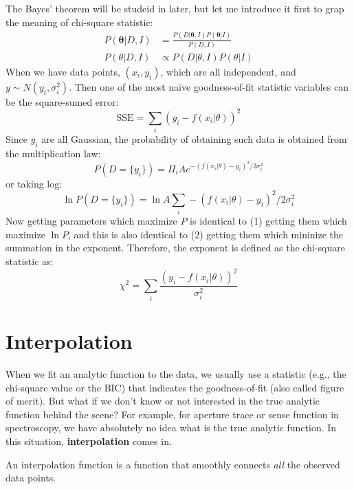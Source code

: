 The Bayes' theorem will be studeid in later, but let me introduce it first to grap the meaning of chi-square statistic:
\begin{align*}
  P(\mathbf{\theta}|D, I) &= \frac{P(D|\mathbf{\theta}, I) P(\mathbf{\theta}|I)}{P(D, I)} \\
  P(\theta|D, I) &\propto P(D | \theta, I) P(\theta|I)
\end{align*}
When we have data points, $ (x_i, y_i) $, which are all independent, and $ y \sim N(y_i, \sigma_i^2) $. Then one of the most na\"{i}ve goodness-of-fit statistic variables can be the square-sumed error:
\begin{equation}\label{eq: sse}
  \mathrm{SSE} = \sum_{i} (y_i - f(x_i| \theta))^2
\end{equation}
Since $ y_i $ are all Gaussian, the probability of obtaining such data is obtained from the multiplication law:
\begin{equation*}
  P(D = \{y_i\}) = \Pi_i A e^{-(f(x_i|\theta)-y_i)^2/2\sigma_i^2} 
\end{equation*}
or taking log:
\begin{equation}
  \ln P(D = \{y_i\}) = \ln A \sum_i -(f(x_i|\theta)-y_i)^2/2\sigma_i^2
\end{equation}
Now getting parameters which maximize $ P $ is identical to (1) getting them which maximize $ \ln P $, and this is also identical to (2) getting them which mininize the summation in the exponent. Therefore, the exponent is defined as the chi-square statistic as:
\begin{equation}\label{eq: chi-square statistic}
  \chi^2 = \sum_i \frac{(y_i - f(x_i | \theta))^2}{\sigma_i^2}
\end{equation}




\section{Interpolation}
When we fit an analytic function to the data, we usually use a statistic (e.g., the chi-square value or the BIC) that indicates the goodness-of-fit (also called figure of merit). But what if we don't know or not interested in the true analytic function behind the scene? For example, for aperture trace or sense function in spectroscopy, we have absolutely no idea what is the true analytic function. In this situation, \textbf{interpolation} comes in. 

\begin{defn}[Interpolation]
An interpolation function is a function that smoothly connects \textit{all} the observed data points.
\end{defn}


